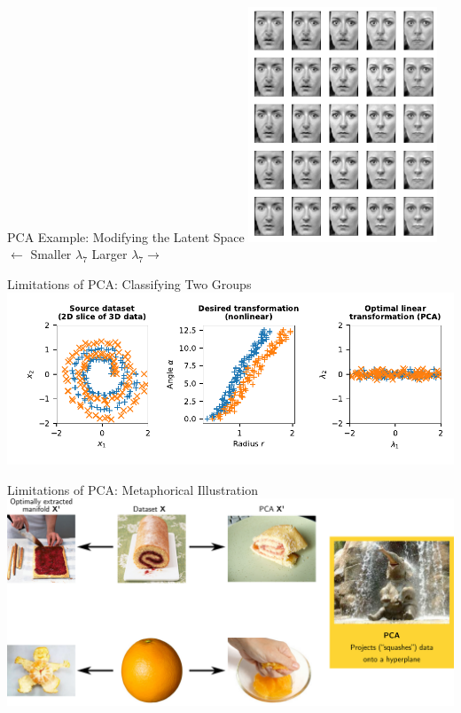 \documentclass[handout,aspectratio=169]{beamer}
\begin{document}
	\begin{frame}{PCA Example: Modifying the Latent Space}
		\centering
		\includegraphics[height=7cm]{media/face_manipulation.pdf}\\
		\hspace{0.33cm} $\leftarrow$ Smaller $\lambda_7$ \hspace{0.75cm} Larger $\lambda_7 \rightarrow$
	\end{frame}

	\begin{frame}{Limitations of PCA: Classifying Two Groups}
		\centering
		\includegraphics[width=\textwidth]{media/pca_limitations_plots.pdf}
	\end{frame}

	\begin{frame}{Limitations of PCA: Metaphorical Illustration}
		\centering
		\vspace{0.25cm}
		\includegraphics{media/pca_limitations.png}\\[0.25cm]
	\end{frame}
\end{document}
